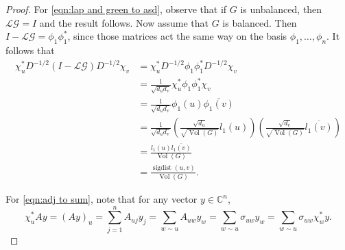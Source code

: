 \documentclass[12pt]{article}
\theoremstyle{definition}
\newcommand{\C}{\mathbb C}
\DeclareMathOperator{\sigdist}{sigdist}
\DeclareMathOperator{\vol}{Vol}
\newcommand{\lap}{\mathcal{L}}
\newcommand{\green}{\mathcal{G}}
\begin{document}
\begin{proof}
For \cref{eqn:lap and green to asd}, observe that if $G$ is unbalanced, then $\lap \green = I$ and the result follows. Now assume that $G$ is balanced. Then $I - \lap \green = \phi_1 \phi_1^*$, since those matrices act the same way on the basis $\phi_1, \dots, \phi_n$. It follows that
\begin{align*}
\chi_u^* D^{-1/2} (I - \lap \green) D^{-1/2} \chi_v
&= \chi_u^* D^{-1/2} \phi_1 \phi_1^* D^{-1/2} \chi_v \\
&= \frac{1}{\sqrt{d_u d_v}} \chi_u^* \phi_1 \phi_1^* \chi_v \\
&= \frac{1}{\sqrt{d_u d_v}} \phi_1(u) \overline{\phi_1(v)} \\
&= \frac{1}{\sqrt{d_u d_v}} \left( \frac{\sqrt{d_u}}{\sqrt{\vol(G)}} l_1(u) \right) \left( \frac{\sqrt{d_v}}{\sqrt{\vol(G)}} \overline{l_1(v)} \right) \\
&= \frac{l_1(u) \overline{l_1(v)}}{\vol(G)} \\
&= \frac{\sigdist(u, v)}{\vol(G)}.
\end{align*}

For \cref{eqn:adj to sum}, note that for any vector $y \in \C^n$, 
$$
\chi_u^* A y = (A y)_{u} = \sum_{j=1}^n A_{uj} y_j = \sum_{w \sim u} A_{uw} y_w = \sum_{w \sim u} \sigma_{uw} y_w = \sum_{w \sim u} \sigma_{uw} \chi^*_w y.
$$
\end{proof}
\end{document}
